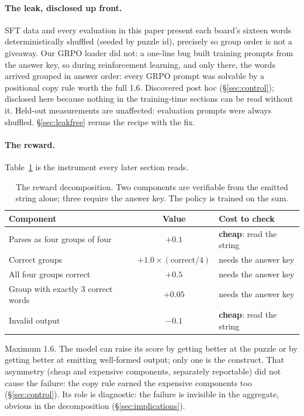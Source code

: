 \documentclass{article}
\begin{document}
\paragraph{The leak, disclosed up front.} SFT data and every evaluation in
this paper present each board's sixteen words deterministically shuffled
(seeded by puzzle id), precisely so group order is not a giveaway. Our GRPO
loader did not: a one-line bug built training prompts from the answer key,
so during reinforcement learning, and only there, the words arrived grouped in answer order: every GRPO prompt was solvable by a positional copy rule worth the full 1.6. Discovered post hoc (\S\ref{sec:control}); disclosed here because nothing in the training-time sections can be read without it. Held-out measurements are unaffected: evaluation prompts were always shuffled. \S\ref{sec:leakfree} reruns the recipe with the fix.

\paragraph{The reward.} Table~\ref{tab:reward} is the instrument every later section reads.

\begin{table}[h]
\centering
\caption{The reward decomposition. Two components are verifiable from the
emitted string alone; three require the answer key. The policy is trained on
the sum.}
\label{tab:reward}
\begin{tabular}{lcl}
\toprule
Component & Value & Cost to check \\
\midrule
Parses as four groups of four & $+0.1$ & \textbf{cheap}: read the string \\
Correct groups & $+1.0 \times (\text{correct}/4)$ & needs the answer key \\
All four groups correct & $+0.5$ & needs the answer key \\
Group with exactly 3 correct words & $+0.05$ & needs the answer key \\
Invalid output & $-0.1$ & \textbf{cheap}: read the string \\
\bottomrule
\end{tabular}
\end{table}

Maximum 1.6. The model can raise its score by getting better at the puzzle
or by getting better at emitting well-formed output; only one is the
construct. That asymmetry (cheap and expensive components, separately reportable) did not cause the failure: the copy rule earned the expensive components too (\S\ref{sec:control}). Its role is diagnostic: the failure is invisible in the aggregate, obvious in the decomposition (\S\ref{sec:implications}).
\end{document}
